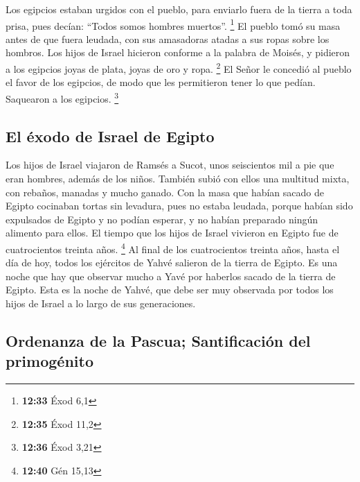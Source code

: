 \begin{paracol}{2}
 Los egipcios estaban urgidos con el pueblo, para
enviarlo fuera de la tierra a toda prisa, pues decían: ``Todos somos
hombres muertos''. \footnote{\textbf{12:33} Éxod 6,1}  El
pueblo tomó su masa antes de que fuera leudada, con sus amasadoras
atadas a sus ropas sobre los hombros.  Los hijos de
Israel hicieron conforme a la palabra de Moisés, y pidieron a los
egipcios joyas de plata, joyas de oro y ropa. \footnote{\textbf{12:35}
  Éxod 11,2}  El Señor le concedió al pueblo el favor de
los egipcios, de modo que les permitieron tener lo que pedían. Saquearon
a los egipcios. \footnote{\textbf{12:36} Éxod 3,21}

\hypertarget{el-uxe9xodo-de-israel-de-egipto}{%
\subsection{El éxodo de Israel de
Egipto}\label{el-uxe9xodo-de-israel-de-egipto}}

 Los hijos de Israel viajaron de Ramsés a Sucot, unos
seiscientos mil a pie que eran hombres, además de los niños.
 También subió con ellos una multitud mixta, con rebaños,
manadas y mucho ganado.  Con la masa que habían sacado de
Egipto cocinaban tortas sin levadura, pues no estaba leudada, porque
habían sido expulsados de Egipto y no podían esperar, y no habían
preparado ningún alimento para ellos.  El tiempo que los
hijos de Israel vivieron en Egipto fue de cuatrocientos treinta años.
\footnote{\textbf{12:40} Gén 15,13}  Al final de los
cuatrocientos treinta años, hasta el día de hoy, todos los ejércitos de
Yahvé salieron de la tierra de Egipto.  Es una noche que
hay que observar mucho a Yavé por haberlos sacado de la tierra de
Egipto. Esta es la noche de Yahvé, que debe ser muy observada por todos
los hijos de Israel a lo largo de sus generaciones.

\hypertarget{ordenanza-de-la-pascua-santificaciuxf3n-del-primoguxe9nito}{%
\subsection{Ordenanza de la Pascua; Santificación del
primogénito}\label{ordenanza-de-la-pascua-santificaciuxf3n-del-primoguxe9nito}}


\end{paracol}

